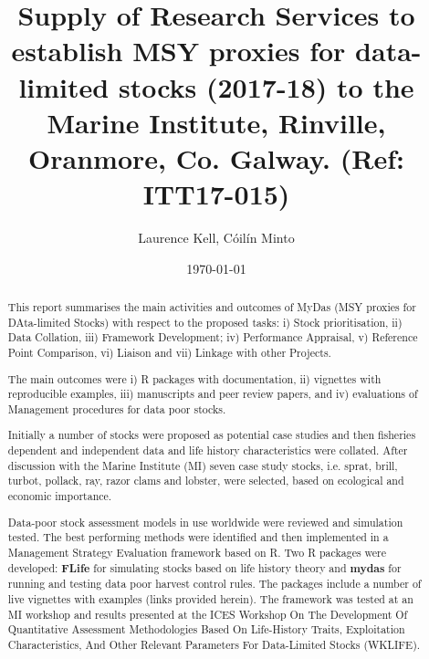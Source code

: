 \documentclass[a4paper, 10pt]{article}
\title{Supply of Research Services to establish MSY proxies for data-limited stocks (2017-18) to the Marine Institute, Rinville, Oranmore, Co. Galway.
(Ref: ITT17-015)}
\author{Laurence Kell, C\'oil\'in Minto}
\date{\today}
\begin{document}

\onehalfspacing
{}
\rhead{}

\maketitle
\thispagestyle{fancy}
\pagestyle{empty}

%

\onehalfspacing
{}
\rhead{}

\maketitle
\thispagestyle{fancy}
\pagestyle{empty}

\maketitle

\begin{abstract}

This report summarises the main activities and outcomes of MyDas (MSY proxies for DAta-limited Stocks) with respect to the proposed tasks: i) Stock prioritisation, ii) Data Collation, iii) Framework Development; iv) Performance Appraisal, v) Reference Point Comparison, vi) Liaison and vii) Linkage with other Projects.

The main outcomes were i) R packages with documentation, ii)  vignettes with reproducible examples, iii) manuscripts and peer review papers, and iv) evaluations of Management procedures for data poor stocks.

Initially a number of stocks were proposed as potential case studies and then fisheries dependent and independent data and life history characteristics were collated.  After discussion with the Marine Institute (MI) seven case study stocks, i.e. sprat, brill, turbot, pollack, ray, razor clams and lobster, were selected, based on ecological and economic importance.

Data-poor stock assessment models in use worldwide were reviewed and simulation tested. The best performing methods were identified and then implemented in a Management Strategy Evaluation framework based on R. Two R packages were developed: \textbf{FLife} for simulating stocks based on life history theory and \textbf{mydas} for running and testing data poor harvest control rules. The packages include a number of live vignettes with examples (links provided herein). The framework was tested at an MI workshop and results presented at the ICES Workshop On The Development Of Quantitative Assessment Methodologies Based On Life-History Traits, Exploitation Characteristics, And Other Relevant Parameters For Data-Limited Stocks (WKLIFE).

\end{abstract}
\end{document}

